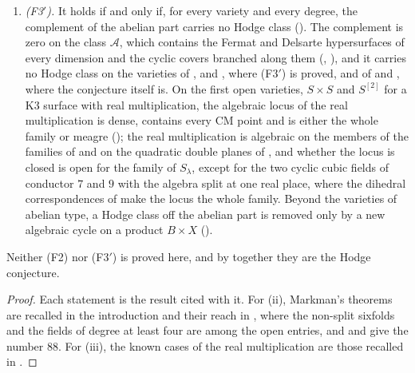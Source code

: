\begin{theorem}
\begin{enumerate}[label=\textup{(\roman*)},leftmargin=2.6em,itemsep=3pt]
  Mumford fourfolds, where the classes are algebraic at every CM point
  () and on every member once one Kuga--Satake class is
  algebraic (), or once one complex at one CM point has
  $\Ext^{2}$ of dimension $119$ (); on the
  square of a Mumford fourfold the two exceptional classes are algebraic
  exactly when one class on a product with an abelian sixfold is
  (the sixfold link of \cite{BB26dense}).
\item \emph{(F3$'$).} It holds if and only if, for every variety and every
  degree, the complement of the abelian part carries no Hodge class
  (). The complement is zero on the class $\mathcal{A}$,
  which contains the Fermat and Delsarte hypersurfaces of every dimension and
  the cyclic covers branched along them (,
  ), and it carries no Hodge class on the varieties of
  ,  and
  , where \textup{(F3$'$)} is proved, and of
   and , where the conjecture itself
  is.
  On the first open varieties, $S\times S$ and $S^{[2]}$ for a K3 surface
  with real multiplication, the algebraic locus of the real multiplication
  is dense, contains every CM point and is either the whole family or meagre
  (); the real multiplication is algebraic on the members
  of the families of \cite{vGS25} and on the quadratic double planes of
  \cite{Sch10}, and whether the locus is closed is open for the family of
  $S_{\lambda}$, except for the two cyclic cubic fields of conductor $7$
  and $9$ with the algebra split at one real place, where
  the dihedral correspondences of \cite{BB26dense} make the locus the
  whole family. Beyond the
  varieties of abelian type, a Hodge
  class off the abelian part is removed only by a new algebraic cycle on a
  product $B\times X$ ().
\end{enumerate}
Neither (F2) nor \textup{(F3$'$)} is proved here, and by 
together they are the Hodge conjecture.
\end{theorem}

\begin{proof}
Each statement is the result cited with it. For (ii), Markman's theorems are
recalled in the introduction and their reach in , where the
non-split sixfolds and the fields of degree at least four are among the open
entries, and \cite[Theorem~5.14]{paperII} and
\cite[Corollary~5.15]{paperII} give the number $88$. For (iii), the known cases of
the real multiplication are those recalled in .
\end{proof}
